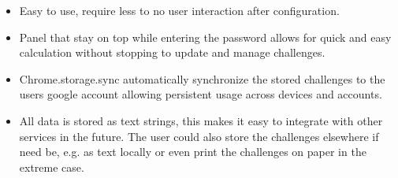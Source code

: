 \begin{itemize}
    \item Easy to use, require less to no user interaction after configuration.
    \item Panel that stay on top while entering the password allows for quick and easy calculation without stopping to update and manage challenges.
    \item Chrome.storage.sync automatically synchronize the stored challenges to the users google account allowing persistent usage across devices and accounts.
    \item All data is stored as text strings, this makes it easy to integrate with other services in the future. The user could also store the challenges elsewhere if need be, e.g. as text locally or even print the challenges on paper in the extreme case.
\end{itemize}






